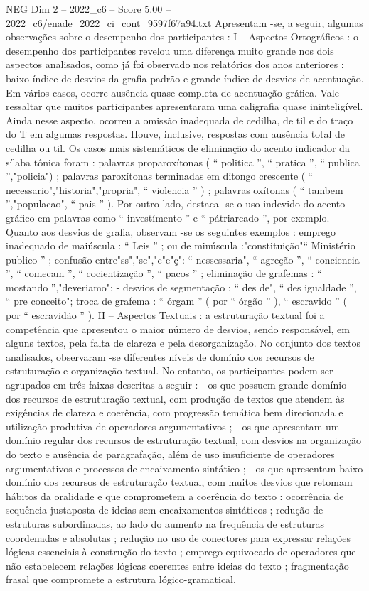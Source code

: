 \begin{textsample}{NEG Dim 2 – 2022\_c6 – Score 5.00 – 2022\_c6/enade\_2022\_ci\_cont\_9597f67a94.txt}
Apresentam -se, a seguir, algumas observações sobre o desempenho dos participantes : I – Aspectos Ortográficos : o desempenho dos participantes revelou uma diferença muito grande nos dois aspectos analisados, como já foi observado nos relatórios dos anos anteriores : baixo índice de desvios da grafia-padrão e grande índice de desvios de acentuação.
Em vários casos, ocorre ausência quase completa de acentuação gráfica.
Vale ressaltar que muitos participantes apresentaram uma caligrafia quase ininteligível.
Ainda nesse aspecto, ocorreu a omissão inadequada de cedilha, de til e do traço do T em algumas respostas.
Houve, inclusive, respostas com ausência total de cedilha ou til.
Os casos mais sistemáticos de eliminação do acento indicador da sílaba tônica foram : palavras proparoxítonas ( “ politica ”, “ pratica ”, “ publica ”,"policia") ; palavras paroxítonas terminadas em ditongo crescente ( “ necessario","historia","propria", “ violencia ” ) ; palavras oxítonas ( “ tambem ”,"populacao", “ pais ” ).
Por outro lado, destaca -se o uso indevido do acento gráfico em palavras como “ investímento ” e “ pátriarcado ”, por exemplo.
Quanto aos desvios de grafia, observam -se os seguintes exemplos : emprego inadequado de maiúscula : “ Leis ” ; ou de minúscula :"constituição"“ Ministério publico ” ; confusão entre"ss","sc","c"e"ç": “ nessessaria", “ agreção ”, “ conciencia ”, “ comecam ”, “ cocientização ”, “ pacos ” ; eliminação de grafemas : “ mostando ”,"deveriamo"; - desvios de segmentação : “ des de", “ des igualdade ”, “ pre conceito"; troca de grafema : “ órgam ” ( por “ órgão ” ), “ escravido ” ( por “ escravidão ” ).
II – Aspectos Textuais : a estruturação textual foi a competência que apresentou o maior número de desvios, sendo responsável, em alguns textos, pela falta de clareza e pela desorganização.
No conjunto dos textos analisados, observaram -se diferentes níveis de domínio dos recursos de estruturação e organização textual.
No entanto, os participantes podem ser agrupados em três faixas descritas a seguir : - os que possuem grande domínio dos recursos de estruturação textual, com produção de textos que atendem às exigências de clareza e coerência, com progressão temática bem direcionada e utilização produtiva de operadores argumentativos ; - os que apresentam um domínio regular dos recursos de estruturação textual, com desvios na organização do texto e ausência de paragrafação, além de uso insuficiente de operadores argumentativos e processos de encaixamento sintático ; - os que apresentam baixo domínio dos recursos de estruturação textual, com muitos desvios que retomam hábitos da oralidade e que comprometem a coerência do texto : ocorrência de sequência justaposta de ideias sem encaixamentos sintáticos ; redução de estruturas subordinadas, ao lado do aumento na frequência de estruturas coordenadas e absolutas ; redução no uso de conectores para expressar relações lógicas essenciais à construção do texto ; emprego equivocado de operadores que não estabelecem relações lógicas coerentes entre ideias do texto ; fragmentação frasal que compromete a estrutura lógico-gramatical.

\end{textsample}
